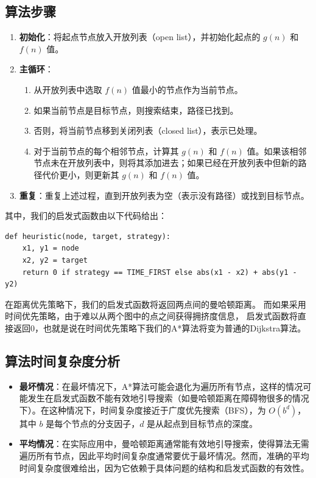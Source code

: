 \documentclass{report}
\begin{document}
\subsection{算法步骤}
\begin{enumerate}
    \item \textbf{初始化}：将起点节点放入开放列表（open list），并初始化起点的 $g(n)$ 和 $f(n)$ 值。
    \item \textbf{主循环}：
    \begin{enumerate}
        \item 从开放列表中选取 $f(n)$ 值最小的节点作为当前节点。
        \item 如果当前节点是目标节点，则搜索结束，路径已找到。
        \item 否则，将当前节点移到关闭列表（closed list），表示已处理。
        \item 对于当前节点的每个相邻节点，计算其 $g(n)$ 和 $f(n)$ 值。如果该相邻节点未在开放列表中，则将其添加进去；如果已经在开放列表中但新的路径代价更小，则更新其 $g(n)$ 和 $f(n)$ 值。
    \end{enumerate}
    \item \textbf{重复}：重复上述过程，直到开放列表为空（表示没有路径）或找到目标节点。
\end{enumerate}
其中，我们的启发式函数由以下代码给出：
\begin{verbatim}
def heuristic(node, target, strategy):
    x1, y1 = node
    x2, y2 = target
    return 0 if strategy == TIME_FIRST else abs(x1 - x2) + abs(y1 - y2)
\end{verbatim}
在距离优先策略下，我们的启发式函数将返回两点间的曼哈顿距离。
而如果采用时间优先策略，由于难以从两个图中的点之间获得拥挤度信息，
启发式函数将直接返回0，也就是说在时间优先策略下我们的A*算法将变为普通的Dijkstra算法。
\subsection{算法时间复杂度分析}
\begin{itemize}
    \item \textbf{最坏情况}：在最坏情况下，A*算法可能会退化为遍历所有节点，这样的情况可能发生在启发式函数不能有效地引导搜索（如曼哈顿距离在障碍物很多的情况下）。在这种情况下，时间复杂度接近于广度优先搜索（BFS），为 $O(b^d)$，其中 $b$ 是每个节点的分支因子，$d$ 是从起点到目标节点的深度。
    \item \textbf{平均情况}：在实际应用中，曼哈顿距离通常能有效地引导搜索，使得算法无需遍历所有节点，因此平均时间复杂度通常要优于最坏情况。然而，准确的平均时间复杂度很难给出，因为它依赖于具体问题的结构和启发式函数的有效性。
\end{itemize}
\end{document}
